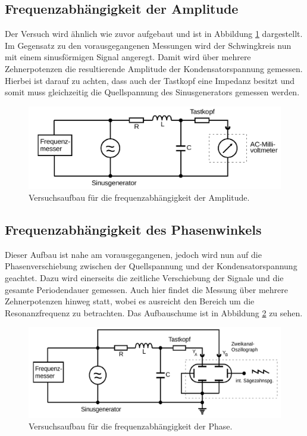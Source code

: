 \subsection{Frequenzabhängigkeit der Amplitude}
Der Versuch wird ähnlich wie zuvor aufgebaut und ist in Abbildung \ref{fig:aufbau3} dargestellt.
Im Gegensatz zu den vorausgegangenen Messungen wird der Schwingkreis nun mit einem sinusförmigen Signal angeregt.
Damit wird über mehrere Zehnerpotenzen die resultierende Amplitude der Kondensatorspannung gemessen.
Hierbei ist darauf zu achten, dass auch der Tastkopf eine Impedanz besitzt und somit muss gleichzeitig die Quellspannung des Sinusgenerators gemessen werden.
\begin{figure}[H]
    \centering
    \caption{Versuchsaufbau für die frequenzabhängigkeit der Amplitude.\cite{v354}}
    \label{fig:aufbau3}
    \includegraphics[width=\textwidth]{content/aufbau3.png}
\end{figure}
\noindent
%
\subsection{Frequenzabhängigkeit des Phasenwinkels}
Dieser Aufbau ist nahe am vorausgegangenen, jedoch wird nun auf die Phasenverschiebung zwischen der Quellspannung und der Kondensatorspannung geachtet.
Dazu wird einerseits die zeitliche Verschiebung der Signale und die gesamte Periodendauer gemessen.
Auch hier findet die Messung über mehrere Zehnerpotenzen hinweg statt, 
wobei es ausreicht den Bereich um die Resonanzfrequenz zu betrachten.
Das Aufbauschume ist in Abbildung \ref{fig:aufbau4} zu sehen.
\begin{figure}[H]
    \centering
    \caption{Versuchsaufbau für die frequenzabhängigkeit der Phase.\cite{v354}}
    \label{fig:aufbau4}
    \includegraphics[width=\textwidth]{content/aufbau4.png}
\end{figure}
\noindent
%
